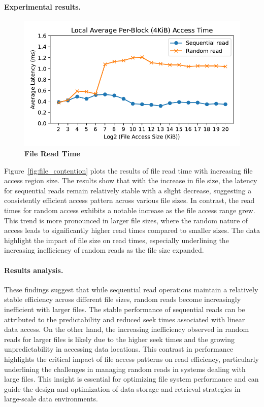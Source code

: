 \paragraph{Experimental results.}
\begin{figure}[t]
	\centering
	\includegraphics[width=0.98\linewidth]{sourcecode/file/file_direct.pdf}
	\caption{\label{fig:file_read_time} \textbf{File Read Time}}
\end{figure}
Figure~\ref{fig:file_contention} plots the results of file read time with increasing file access region size.
The results show that with the increase in file size, the latency for sequential reads remain relatively stable with a slight decrease, suggesting a consistently efficient access pattern across various file sizes. In contrast, the read times for random access exhibits a notable increase as the file access range grew. This trend is more pronounced in larger file sizes, where the random nature of access leads to significantly higher read times compared to smaller sizes. The data highlight the impact of file size on read times, especially underlining the increasing inefficiency of random reads as the file size expanded.

\paragraph{Results analysis.}
These findings suggest that while sequential read operations maintain a relatively stable efficiency across different file sizes, random reads become increasingly inefficient with larger files. The stable performance of sequential reads can be attributed to the predictability and reduced seek times associated with linear data access. On the other hand, the increasing inefficiency observed in random reads for larger files is likely due to the higher seek times and the growing unpredictability in accessing data locations. This contrast in performance highlights the critical impact of file access patterns on read efficiency, particularly underlining the challenges in managing random reads in systems dealing with large files. This insight is essential for optimizing file system performance and can guide the design and optimization of data storage and retrieval strategies in large-scale data environments.

